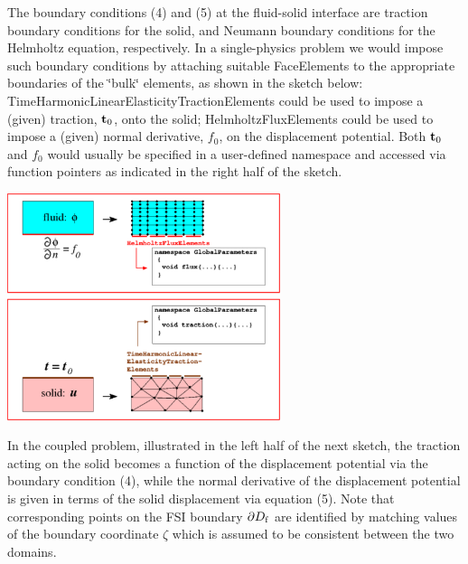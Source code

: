 The boundary conditions (4) and (5) at the fluid-\/solid interface are traction boundary conditions for the solid, and Neumann boundary conditions for the Helmholtz equation, respectively. In a single-\/physics problem we would impose such boundary conditions by attaching suitable {\ttfamily Face\+Elements} to the appropriate boundaries of the \char`\"{}bulk\char`\"{} elements, as shown in the sketch below\+: {\ttfamily Time\+Harmonic\+Linear\+Elasticity\+Traction\+Elements} could be used to impose a (given) traction, $ {\bf t}_0$, onto the solid; {\ttfamily Helmholtz\+Flux\+Elements} could be used to impose a (given) normal derivative, $ f_0$, on the displacement potential. Both $ {\bf t}_0$ and $ f_0 $ would usually be specified in a user-\/defined namespace and accessed via function pointers as indicated in the right half of the sketch.

 
\begin{DoxyImage}
\includegraphics[width=0.6\textwidth]{single_physics}
\end{DoxyImage}


In the coupled problem, illustrated in the left half of the next sketch, the traction acting on the solid becomes a function of the displacement potential via the boundary condition (4), while the normal derivative of the displacement potential is given in terms of the solid displacement via equation (5). Note that corresponding points on the F\+SI boundary $ \partial D_{\rm f}$ are identified by matching values of the boundary coordinate $ \zeta $ which is assumed to be consistent between the two domains.

